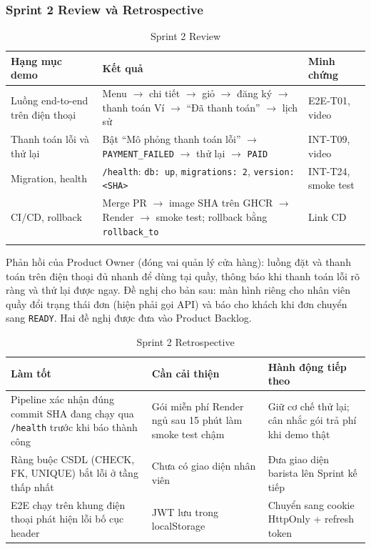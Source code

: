 \documentclass[a4paper]{article}
\newcommand{\st}[1]{\texttt{#1}}
\newcommand{\ra}{\ensuremath{\rightarrow}}
\begin{document}
\subsubsection{Sprint 2 Review và Retrospective}\label{sec:review}
\begin{longtable}{|L{4.4cm}|L{7cm}|L{3.6cm}|}
\hline
\textbf{Hạng mục demo} & \textbf{Kết quả} & \textbf{Minh chứng} \\ \hline
\endhead
Luồng end-to-end trên điện thoại & Menu \ra{} chi tiết \ra{} giỏ \ra{} đăng ký \ra{} thanh toán Ví \ra{} ``Đã thanh toán'' \ra{} lịch sử & E2E-T01, video \\ \hline
Thanh toán lỗi và thử lại & Bật ``Mô phỏng thanh toán lỗi'' \ra{} \st{PAYMENT\_FAILED} \ra{} thử lại \ra{} \st{PAID} & INT-T09, video \\ \hline
Migration, health & \st{/health}: \st{db: up}, \st{migrations: 2}, \st{version: <SHA>} & INT-T24, smoke test \\ \hline
CI/CD, rollback & Merge PR \ra{} image SHA trên GHCR \ra{} Render \ra{} smoke test; rollback bằng \st{rollback\_to} & Link CD \\ \hline
\caption{Sprint 2 Review}
\end{longtable}
Phản hồi của Product Owner (đóng vai quản lý cửa hàng): luồng đặt và thanh toán trên điện thoại đủ nhanh để dùng tại quầy, thông báo khi thanh toán lỗi rõ ràng và thử lại được ngay. Đề nghị cho bản sau: màn hình riêng cho nhân viên quầy đổi trạng thái đơn (hiện phải gọi API) và báo cho khách khi đơn chuyển sang \st{READY}. Hai đề nghị được đưa vào Product Backlog.

\begin{table}[H]
\centering\small
\begin{tabular}{|L{4.7cm}|L{4.7cm}|L{4.9cm}|}
\hline
\textbf{Làm tốt} & \textbf{Cần cải thiện} & \textbf{Hành động tiếp theo} \\ \hline
Pipeline xác nhận đúng commit SHA đang chạy qua \st{/health} trước khi báo thành công & Gói miễn phí Render ngủ sau 15 phút làm smoke test chậm & Giữ cơ chế thử lại; cân nhắc gói trả phí khi demo thật \\ \hline
Ràng buộc CSDL (CHECK, FK, UNIQUE) bắt lỗi ở tầng thấp nhất & Chưa có giao diện nhân viên & Đưa giao diện barista lên Sprint kế tiếp \\ \hline
E2E chạy trên khung điện thoại phát hiện lỗi bố cục header & JWT lưu trong localStorage & Chuyển sang cookie HttpOnly + refresh token \\ \hline
\end{tabular}
\caption{Sprint 2 Retrospective}
\end{table}
\end{document}
